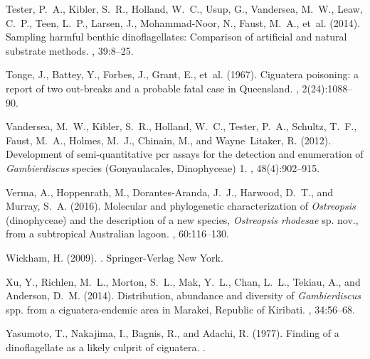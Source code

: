 \documentclass[10pt,letterpaper]{article}
\begin{document}
\begin{thebibliography}{10}
Tester, P.~A., Kibler, S.~R., Holland, W.~C., Usup, G., Vandersea, M.~W., Leaw,
  C.~P., Teen, L.~P., Larsen, J., Mohammad-Noor, N., Faust, M.~A., et~al.
  (2014).
\newblock Sampling harmful benthic dinoflagellates: Comparison of artificial
  and natural substrate methods.
, 39:8--25.

Tonge, J., Battey, Y., Forbes, J., Grant, E., et~al. (1967).
\newblock Ciguatera poisoning: a report of two out-breaks and a probable fatal
  case in {Q}ueensland.
, 2(24):1088--90.

Vandersea, M.~W., Kibler, S.~R., Holland, W.~C., Tester, P.~A., Schultz, T.~F.,
  Faust, M.~A., Holmes, M.~J., Chinain, M., and Wayne~Litaker, R. (2012).
\newblock Development of semi-quantitative pcr assays for the detection and
  enumeration of \emph{Gambierdiscus} species ({G}onyaulacales, {D}inophyceae)
  1.
, 48(4):902--915.

Verma, A., Hoppenrath, M., Dorantes-Aranda, J.~J., Harwood, D.~T., and Murray,
  S.~A. (2016).
\newblock Molecular and phylogenetic characterization of \emph{Ostreopsis}
  (dinophyceae) and the description of a new species, \emph{Ostreopsis
  rhodesae} sp. nov., from a subtropical {A}ustralian lagoon.
, 60:116--130.

Wickham, H. (2009).
.
\newblock Springer-Verlag New York.

Xu, Y., Richlen, M.~L., Morton, S.~L., Mak, Y.~L., Chan, L.~L., Tekiau, A., and
  Anderson, D.~M. (2014).
\newblock Distribution, abundance and diversity of \emph{Gambierdiscus} spp.
  from a ciguatera-endemic area in {M}arakei, {R}epublic of {K}iribati.
, 34:56--68.

Yasumoto, T., Nakajima, I., Bagnis, R., and Adachi, R. (1977).
\newblock Finding of a dinoflagellate as a likely culprit of ciguatera.
.

\end{thebibliography}
\end{document}
